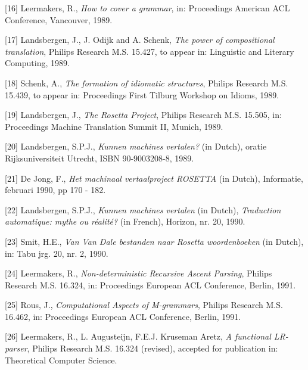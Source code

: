 [16] Leermakers, R., {\em How to cover a grammar},
in: {\sf Proceedings American ACL Conference}, Vancouver, 1989.

\bigskip

[17] Landsbergen, J., J. Odijk and A. Schenk, {\em The power of compositional 
translation}, Philips Research M.S. 15.427, 
to appear in: {\sf Linguistic and Literary Computing}, 1989. 

\bigskip

[18] Schenk, A., {\em The formation of idiomatic structures}, 
Philips Research M.S. 15.439, to appear in: 
{\sf Proceedings First Tilburg Workshop on Idioms}, 1989.

\bigskip

[19] Landsbergen, J., {\em The Rosetta Project}, Philips Research M.S. 15.505,
in: {\sf Proceedings Machine Translation Summit II}, Munich, 1989.

\bigskip

[20] Landsbergen, S.P.J., {\em Kunnen machines vertalen?} (in Dutch), oratie 
Rijksuniversiteit Utrecht, ISBN 90-9003208-8, 1989.

\bigskip

[21] De Jong, F., {\em Het machinaal vertaalproject ROSETTA} (in Dutch), 
Informatie, februari 1990, pp 170 - 182.

\bigskip

[22] Landsbergen, S.P.J., {\em Kunnen machines vertalen} (in Dutch),
{\em Traduction automatique: mythe ou r\'{e}alit\'{e}?} (in French),
Horizon, nr. 20, 1990.

\bigskip

[23] Smit, H.E., {\em Van Van Dale bestanden naar Rosetta woordenboeken}
(in Dutch), in: {\sf Tabu jrg. 20, nr. 2, 1990}.

\bigskip


[24] Leermakers, R., {\em Non-deterministic Recursive Ascent Parsing},
Philips Research M.S. 16.324, in: {\sf Proceedings European ACL Conference}, 
Berlin, 1991.
 
\bigskip

[25] Rous, J., {\em Computational Aspects of M-grammars},
Philips Research M.S. 16.462,
in: {\sf Proceedings European ACL Conference}, Berlin, 1991.

\bigskip

[26] Leermakers, R., L. Augusteijn, F.E.J. Kruseman Aretz,
{\em A functional LR-parser},
Philips Research M.S. 16.324 (revised), accepted for publication in: {\sf 
Theoretical Computer Science}. 

